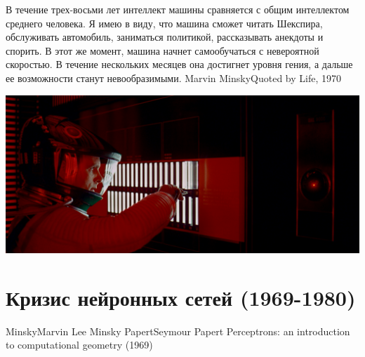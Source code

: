 \documentclass[24pt,pdf,hyperref={unicode},aspectratio=169]{beamer}
\begin{document}
\begin{frame}
\end{frame}

\begin{frame}
\end{frame}


\begin{frame}
\end{frame}


\begin{frame}
\citate
{
В течение трех-восьми лет интеллект машины сравняется с общим интеллектом среднего человека. Я имею в виду, что машина сможет читать Шекспира, обслуживать автомобиль, заниматься политикой, рассказывать анекдоты и спорить. В этот же момент, машина начнет самообучаться с невероятной скоростью. В течение нескольких месяцев она достигнет уровня гения, а дальше ее возможности станут невообразимыми. 
}{Marvin Minsky}{Quoted by Life, 1970}
\end{frame}

\begin{frame}
\includegraphics[width=\textwidth]{Portraits/HAL9000.jpg}
\end{frame}


\section{Кризис нейронных сетей (1969-1980)}

\begin{frame}


\doublebio
{Minsky}{Marvin Lee Minsky}
{Papert}{Seymour Papert}
{Perceptrons: an introduction to computational geometry (1969)}

\end{frame}
\end{document}
